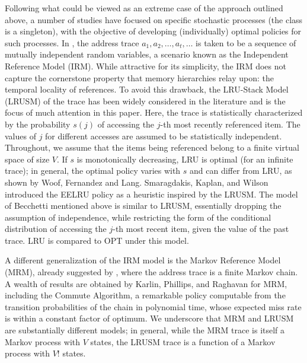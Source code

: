 \documentclass[11pt,a4paper]{article}
\theoremstyle{definition}
\theoremstyle{remark}
\begin{document}
Following what could be viewed as an extreme case of the approach
outlined above, a number of studies have focused on specific
stochastic processes (the class is a singleton), with the objective of
developing (individually) optimal policies for such processes.  In
\cite{FranaszekW74}, the address trace $a_1,a_2, \ldots, a_t, \ldots$
is taken to be a sequence of mutually independent random variables, a
scenario known as the Independent Reference Model (IRM).  While
attractive for its simplicity, the IRM does not capture the
cornerstone property that memory hierarchies relay upon: the temporal
locality of references.  To avoid this drawback, the LRU-Stack Model
(LRUSM) of the trace \cite{OdenS72,SpirnD72} has been widely
considered in the literature
\cite{TurnerS77,EffelsbergH84,KobayashiM89} and is the focus of much
attention in this paper.  Here, the trace is statistically
characterized by the probability $s(j)$ of accessing the $j$-th most
recently referenced item.  The values of $j$ for different accesses
are assumed to be statistically independent. Throughout, we assume
that the items being referenced belong to a finite virtual space of
size $V$.  If $s$ is monotonically decreasing, LRU is optimal
\cite{SpirnD72} (for an infinite trace); in general, the optimal
policy varies with $s$ and can differ from LRU, as shown by Woof,
Fernandez and Lang\cite{WoodFL77,WoodFL83}. Smaragdakis, Kaplan, and
Wilson\cite{SmaragdakisKW99,SmaragdakisKW03} introduced the EELRU
policy as a heuristic inspired by the LRUSM. The model of Becchetti
\cite{Becchetti04} mentioned above is similar to LRUSM,  essentially
dropping the assumption of independence, while restricting the form of
the conditional distribution of accessing the $j$-th most recent item,
given the value of the past trace. LRU is compared to OPT under this
model.

A different generalization of the IRM model is the Markov Reference
Model (MRM), already suggested by \cite{MattsonGST70}, where the
address trace is a finite Markov chain.  A wealth of results are
obtained by Karlin, Phillips, and Raghavan \cite{KarlinPR00} for MRM,
including the Commute Algorithm, a remarkable policy computable from
the transition probabilities of the chain in polynomial time, whose
expected miss rate is within a constant factor of optimum. We
underscore that MRM and LRUSM are substantially different models; in
general, while the MRM trace is itself a Markov process with $V$
states, the LRUSM trace is a function of a Markov process with $V!$
states.
\end{document}
